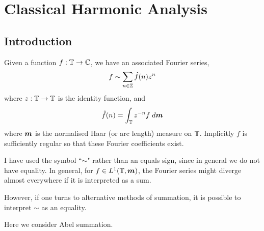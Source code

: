 
\chapter{Classical Harmonic Analysis} %

\label{ClassicalHarmonicAnalysis} %



\section{Introduction}
Given a function $f:\mathbb{T}\rightarrow\mathbb{C}$, we have an associated Fourier series, 
\begin{equation}
\label{series}
    f \sim \sum_{n \in \Itgr} \hat{f}(n)z^n
\end{equation}
where $z:\mathbb{T}\rightarrow\mathbb{T}$ is the identity function, and
\begin{equation}
\label{coefficient}
    \hat{f}(n) = \int_\Circ z^{-n} f\;d\ha
\end{equation}
where $\boldsymbol{m}$ is the normalised Haar (or arc length) measure on $\mathbb{T}$. Implicitly
$f$ is sufficiently regular so that these Fourier coefficients exist.

I have used the symbol ``$\sim$" rather than an equals sign, since in general
we do not have equality. In general, for $f \in L^1(\mathbb{T},\boldsymbol{m})$, the Fourier
series might diverge almost everywhere if it is interpreted as a sum.

However, if one turns to alternative methods of summation, it is possible to 
interpret $\sim$ as an equality. 

Here we consider Abel summation.

